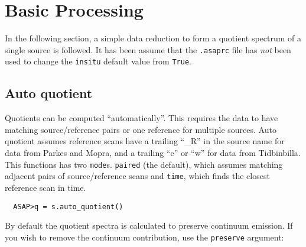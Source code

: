 \documentclass[11pt]{article}
\newcommand{\cmd}[1]{{\tt #1}}
\begin{document}

%
%
%

\section{Basic Processing}

In the following section, a simple data reduction to form a quotient
spectrum of a single source is followed.  It has been assume that the
\cmd{.asaprc} file has {\em not} been used to change the \cmd{insitu}
default value from \cmd{True}.

\subsection{Auto quotient}
Quotients can be computed ``automatically''. This
requires the data to have matching source/reference pairs or one
reference for multiple sources. Auto quotient assumes reference scans
have a trailing ``\_R'' in the source name for data from Parkes and
Mopra, and a trailing ``e'' or ``w'' for data from Tidbinbilla.
This functions has two \cmd{mode}s. \cmd{paired} (the default), which assumes
matching adjacent pairs of source/reference scans and \cmd{time}, which finds
the closest reference scan in time.

\begin{verbatim}
  ASAP>q = s.auto_quotient()
\end{verbatim}

By default the quotient spectra is calculated
to preserve continuum emission. If you wish to remove the continuum
contribution, use the \cmd{preserve} argument:
\end{document}

